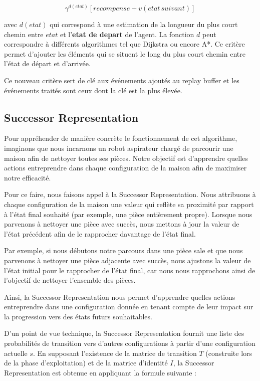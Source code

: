 \documentclass{article}
\begin{document}
$$\gamma^{d(etat)}[recompense + v(etat\,suivant)]$$
 
avec $d(etat)$ qui correspond à une estimation de la longueur du plus court chemin entre $etat$ et l’\textbf{etat de depart} de l’agent. La fonction $d$ peut correspondre à différents algorithmes tel que Dijkstra ou encore A*. Ce critère permet d’ajouter les éléments qui se situent le long du plus court chemin entre l’état de départ et d’arrivée.


Ce nouveau critère sert de clé aux événements ajoutés au replay buffer et les événements traités sont ceux dont la clé est la plus élevée.

\subsection{Successor Representation}

Pour appréhender de manière concrète le fonctionnement de cet algorithme, imaginons que nous incarnons un robot aspirateur chargé de parcourir une maison afin de nettoyer toutes ses pièces. Notre objectif est d'apprendre quelles actions entreprendre dans chaque configuration de la maison afin de maximiser notre efficacité.

Pour ce faire, nous faisons appel à la Successor Representation. Nous attribuons à chaque configuration de la maison une valeur qui reflète sa proximité par rapport à l'état final souhaité (par exemple, une pièce entièrement propre). Lorsque nous parvenons à nettoyer une pièce avec succès, nous mettons à jour la valeur de l'état précédent afin de le rapprocher davantage de l'état final.

Par exemple, si nous débutons notre parcours dans une pièce sale et que nous parvenons à nettoyer une pièce adjacente avec succès, nous ajustons la valeur de l'état initial pour le rapprocher de l'état final, car nous nous rapprochons ainsi de l'objectif de nettoyer l'ensemble des pièces.

Ainsi, la Successor Representation nous permet d'apprendre quelles actions entreprendre dans une configuration donnée en tenant compte de leur impact sur la progression vers des états futurs souhaitables.

D'un point de vue technique, la Successor Representation fournit une liste des probabilités de transition vers d'autres configurations à partir d'une configuration actuelle \( s \). En supposant l'existence de la matrice de transition \( T \) (construite lors de la phase d'exploitation) et de la matrice d'identité \( I \), la Successor Representation est obtenue en appliquant la formule suivante :
\end{document}
